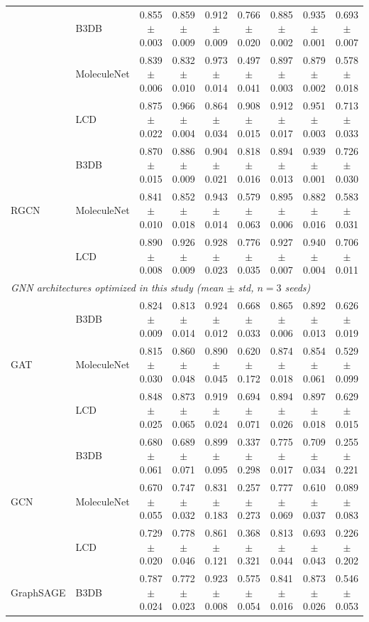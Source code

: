 \documentclass[conference]{IEEEtran}
\begin{document}
\begin{table}[htbp]
\begin{tabular}{llccccccc}
    & B3DB        & 0.855$\pm$0.003 & 0.859$\pm$0.009 & 0.912$\pm$0.009 & 0.766$\pm$0.020 & 0.885$\pm$0.002 & 0.935$\pm$0.001 & 0.693$\pm$0.007 \\
    & MoleculeNet & 0.839$\pm$0.006 & 0.832$\pm$0.010 & 0.973$\pm$0.014 & 0.497$\pm$0.041 & 0.897$\pm$0.003 & 0.879$\pm$0.002 & 0.578$\pm$0.018 \\
    & LCD      & 0.875$\pm$0.022 & 0.966$\pm$0.004 & 0.864$\pm$0.034 & 0.908$\pm$0.015 & 0.912$\pm$0.017 & 0.951$\pm$0.003 & 0.713$\pm$0.033 \\
\hline
\multirow{3}{*}{RGCN}
    & B3DB        & 0.870$\pm$0.015 & 0.886$\pm$0.009 & 0.904$\pm$0.021 & 0.818$\pm$0.016 & 0.894$\pm$0.013 & 0.939$\pm$0.001 & 0.726$\pm$0.030 \\
    & MoleculeNet & 0.841$\pm$0.010 & 0.852$\pm$0.018 & 0.943$\pm$0.014 & 0.579$\pm$0.063 & 0.895$\pm$0.006 & 0.882$\pm$0.016 & 0.583$\pm$0.031 \\
    & LCD      & 0.890$\pm$0.008 & 0.926$\pm$0.009 & 0.928$\pm$0.023 & 0.776$\pm$0.035 & 0.927$\pm$0.007 & 0.940$\pm$0.004 & 0.706$\pm$0.011 \\
\hline
\multicolumn{9}{l}{\textit{GNN architectures optimized in this study (mean $\pm$ std, $n=3$ seeds)}} \\
\hline
\multirow{3}{*}{GAT}
    & B3DB        & 0.824$\pm$0.009 & 0.813$\pm$0.014 & 0.924$\pm$0.012 & 0.668$\pm$0.033 & 0.865$\pm$0.006 & 0.892$\pm$0.013 & 0.626$\pm$0.019 \\
    & MoleculeNet & 0.815$\pm$0.030 & 0.860$\pm$0.048 & 0.890$\pm$0.045 & 0.620$\pm$0.172 & 0.874$\pm$0.018 & 0.854$\pm$0.061 & 0.529$\pm$0.099 \\
    & LCD         & 0.848$\pm$0.025 & 0.873$\pm$0.065 & 0.919$\pm$0.024 & 0.694$\pm$0.071 & 0.894$\pm$0.026 & 0.897$\pm$0.018 & 0.629$\pm$0.015 \\
\hline
\multirow{3}{*}{GCN}
    & B3DB        & 0.680$\pm$0.061 & 0.689$\pm$0.071 & 0.899$\pm$0.095 & 0.337$\pm$0.298 & 0.775$\pm$0.017 & 0.709$\pm$0.034 & 0.255$\pm$0.221 \\
    & MoleculeNet & 0.670$\pm$0.055 & 0.747$\pm$0.032 & 0.831$\pm$0.183 & 0.257$\pm$0.273 & 0.777$\pm$0.069 & 0.610$\pm$0.037 & 0.089$\pm$0.083 \\
    & LCD         & 0.729$\pm$0.020 & 0.778$\pm$0.046 & 0.861$\pm$0.121 & 0.368$\pm$0.321 & 0.813$\pm$0.044 & 0.693$\pm$0.043 & 0.226$\pm$0.202 \\
\hline
\multirow{3}{*}{GraphSAGE}
    & B3DB        & 0.787$\pm$0.024 & 0.772$\pm$0.023 & 0.923$\pm$0.008 & 0.575$\pm$0.054 & 0.841$\pm$0.016 & 0.873$\pm$0.026 & 0.546$\pm$0.053 \\

\end{tabular}
\end{table}
\end{document}
